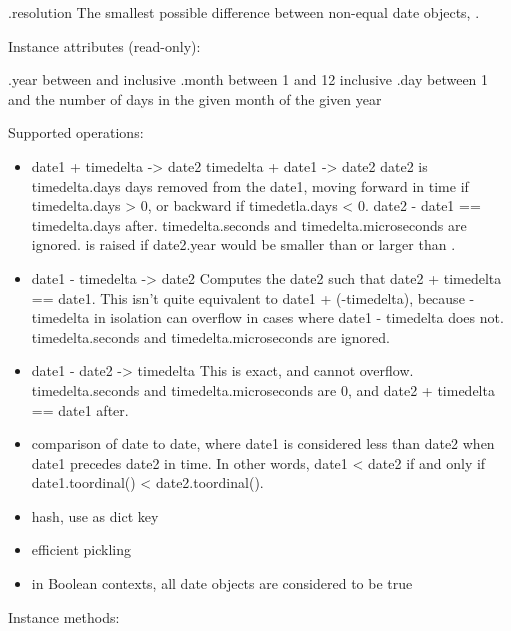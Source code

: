     .resolution
        The smallest possible difference between non-equal date
        objects, .

Instance attributes (read-only):

    .year           between  and  inclusive
    .month          between 1 and 12 inclusive
    .day            between 1 and the number of days in the given month
                    of the given year

Supported operations:

\begin{itemize}
  \item
    date1 + timedelta -> date2
    timedelta + date1 -> date2
    date2 is timedelta.days days removed from the date1, moving forward
    in time if timedelta.days > 0, or backward if timedetla.days < 0.
    date2 - date1 == timedelta.days after.  timedelta.seconds and
    timedelta.microseconds are ignored.   is
    raised if date2.year would be smaller than  or
    larger than .

  \item
    date1 - timedelta -> date2
    Computes the date2 such that date2 + timedelta == date1.  This
    isn't quite equivalent to date1 + (-timedelta), because -timedelta
    in isolation can overflow in cases where date1 - timedelta does
    not.  timedelta.seconds and timedelta.microseconds are ignored.

  \item
    date1 - date2 -> timedelta
    This is exact, and cannot overflow.  timedelta.seconds and
    timedelta.microseconds are 0, and date2 + timedelta == date1
    after.

  \item
    comparison of date to date, where date1 is considered less than
    date2 when date1 precedes date2 in time.  In other words,
    date1 < date2 if and only if date1.toordinal() < date2.toordinal().

  \item
    hash, use as dict key

  \item
    efficient pickling

  \item
    in Boolean contexts, all date objects are considered to be true
\end{itemize}

Instance methods:

